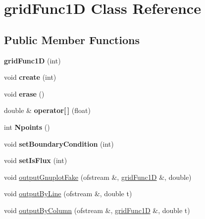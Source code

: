 \hypertarget{classgrid_func1_d}{\section{grid\-Func1\-D Class Reference}
\label{classgrid_func1_d}
}
\subsection*{Public Member Functions}
\begin{DoxyCompactItemize}
\item 
\hypertarget{classgrid_func1_d_a3f83c015b602a1d4ea0a0b9bf00812bd}{{\bfseries grid\-Func1\-D} (int)}\label{classgrid_func1_d_a3f83c015b602a1d4ea0a0b9bf00812bd}

\item 
\hypertarget{classgrid_func1_d_a0d33423ea192c516bfaf9c0cc77cd943}{void {\bfseries create} (int)}\label{classgrid_func1_d_a0d33423ea192c516bfaf9c0cc77cd943}

\item 
\hypertarget{classgrid_func1_d_a4df1b6d0de38c1d13e2cfc473d77cb5d}{void {\bfseries erase} ()}\label{classgrid_func1_d_a4df1b6d0de38c1d13e2cfc473d77cb5d}

\item 
\hypertarget{classgrid_func1_d_a5c270cddc809aa94b3dfce3588b8aacd}{double \& {\bfseries operator\mbox{[}$\,$\mbox{]}} (float)}\label{classgrid_func1_d_a5c270cddc809aa94b3dfce3588b8aacd}

\item 
\hypertarget{classgrid_func1_d_a2846a01ea511282d49f2492fea14be4f}{int {\bfseries Npoints} ()}\label{classgrid_func1_d_a2846a01ea511282d49f2492fea14be4f}

\item 
\hypertarget{classgrid_func1_d_a83347f8764f77eef88ef326ef71d96b3}{void {\bfseries set\-Boundary\-Condition} (int)}\label{classgrid_func1_d_a83347f8764f77eef88ef326ef71d96b3}

\item 
\hypertarget{classgrid_func1_d_aba748038bbce60927dd328ebe5f712ac}{void {\bfseries set\-Is\-Flux} (int)}\label{classgrid_func1_d_aba748038bbce60927dd328ebe5f712ac}

\item 
void \hyperlink{classgrid_func1_d_af85fb7fc7b08ac1bf828128cd91fa5e0}{output\-Gnuplot\-Fake} (ofstream \&, \hyperlink{classgrid_func1_d}{grid\-Func1\-D} \&, double)
\item 
void \hyperlink{classgrid_func1_d_a65df48626ce78e85aa57fdd3b2e4277f}{output\-By\-Line} (ofstream \&, double t)
\item 
void \hyperlink{classgrid_func1_d_ab519f135db99a96e8c34fcc0c2bab4e8}{output\-By\-Column} (ofstream \&, \hyperlink{classgrid_func1_d}{grid\-Func1\-D} \&, double t)
\end{DoxyCompactItemize}
